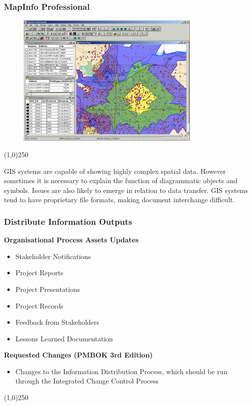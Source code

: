 \begin{frame}
\frametitle{MapInfo Professional}
\begin{figure}
	\centering
		\includegraphics[width = 9cm]{images/mapinfo.jpg}
	\label{fig:mapinfo}
\end{figure}
\end{frame}\begin{center}\line(1,0){250}\end{center}

GIS systems are capable of showing highly complex spatial data.  However sometimes it is necessary to explain the function of diagrammatic objects and symbols.  Issues are also likely to emerge in relation to data transfer.  GIS systems tend to have proprietary file formats, making document interchange difficult.



\begin{frame}
\frametitle{Distribute Information \hfill\hfill Outputs}
\textbf{Organisational Process Assets Updates}
\begin{itemize}
	\item Stakeholder Notifications
	\item Project Reports
	\item Project Presentations
	\item Project Records
	\item Feedback from Stakeholders
	\item Lessons Learned Documentation
\end{itemize}
\textbf{Requested Changes (PMBOK 3rd Edition)}
\begin{itemize}
	\item Changes to the Information Distribution Process, which should be run through the Integrated Change Control Process
\end{itemize}
\end{frame}\begin{center}\line(1,0){250}\end{center}









